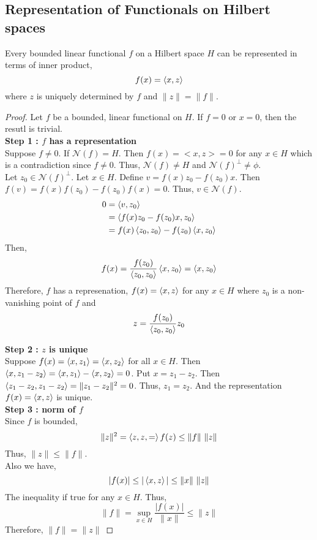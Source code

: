 
\setcounter{subsection}{7}

\subsection{Representation of Functionals on Hilbert spaces}

\begin{theorem}[Riesz]
	Every bounded linear functional $f$ on a Hilbert space $H$ can be represented in terms of inner product,
	\[ f(x) = \left\langle x,z \right\rangle \]
	where $z$ is uniquely determined by $f$ and $\|z\| = \|f\|$.
\end{theorem}
\begin{proof}
	Let $f$ be a bounded, linear functional on $H$.
	If $f = 0$ or $x = 0$, then the resutl is trivial.\\

	\textbf{Step 1 : $f$ has a representation}\\
	Suppose $f \ne 0$.
	If $\mathcal{N}(f) = H$.
	Then $f(x) = <x,z> = 0$ for any $x \in H$ which is a contradiction since $f \ne 0$.
	Thus, $\mathcal{N}(f) \ne H$ and $\mathcal{N}(f)^\perp \ne \phi$.\\

	Let $z_0 \in \mathcal{N}(f)^\perp$.
	Let $x \in H$.
	Define $v = f(x)z_0 - f(z_0)x$.
	Then $f(v) = f(x)f(z_0) - f(z_0)f(x) = 0$.
	Thus, $v \in \mathcal{N}(f)$.\\

	\begin{align*}
		0
		& = \left\langle v,z_0 \right\rangle \\
		& = \left\langle f(x)z_0-f(z_0)x,z_0 \right\rangle \\
		& = f(x)\left\langle z_0,z_0 \right\rangle - f(z_0)\left\langle x,z_0 \right\rangle 
	\end{align*}
	Then,
	\[ f(x) = \frac{f(z_0)}{\left\langle z_0,z_0 \right\rangle} \left\langle x,z_0 \right\rangle = \left\langle x,z_0 \right\rangle \]
	Therefore, $f$ has a represenation, $f(x) = \left\langle x,z \right\rangle$ for any $x \in H$ where $z_0$ is a non-vanishing point of $f$ and
	\[ z = \frac{f(z_0)}{\left\langle z_0,z_0 \right\rangle} z_0 \]

	\textbf{Step 2 : $z$ is unique}\\
	Suppose $f(x) = \left\langle x,z_1 \right\rangle = \left\langle x,z_2 \right\rangle$ for all $x \in H$.
	Then $\left\langle x,z_1-z_2 \right\rangle = \left\langle x,z_1 \right\rangle - \left\langle x,z_2 \right\rangle = 0$.
	Put $x = z_1 - z_2$.
	Then $\left\langle z_1-z_2,z_1-z_2 \right\rangle = \|z_1-z_2\|^2 = 0$.
	Thus, $z_1=z_2$.
	And the representation $f(x) = \left\langle x,z \right\rangle$ is unique.\\

	\textbf{Step 3 : norm of $f$}\\
	Since $f$ is bounded,
	\[ \|z\|^2 = \left\langle z,z,= \right\rangle f(z) \le \|f\| \ \|z\| \]
	Thus, $\|z\| \le \|f\|$.\\

	Also we have,
	\[ |f(x)| \le |\left\langle x,z \right\rangle| \le \|x\| \ \|z\| \]
	The inequality if true for any $x \in H$.
	Thus,
	\[ \|f\| = \sup_{x \in H} \frac{|f(x)|}{\|x\|} \le \|z\| \]
	Therefore, $\|f\| = \|z\|$
\end{proof}

